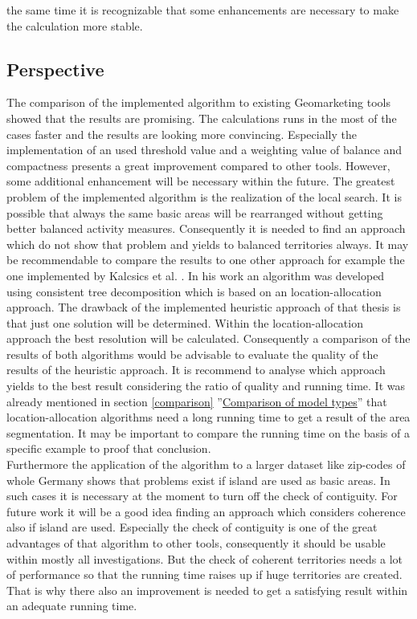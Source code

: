 the same time it is recognizable that some enhancements are necessary to make the calculation more stable.

\newpage
\subsection{Perspective}
The comparison of the implemented algorithm to existing Geomarketing tools showed that the results are promising. The calculations runs in the most of the cases faster and the results are looking more convincing. Especially the implementation of an used threshold value and a weighting value of balance and compactness presents a great improvement compared to other tools. However, some additional enhancement will be necessary within the future. The greatest problem of the implemented algorithm is the realization of the local search. It is possible that always the same basic areas will be rearranged without getting better balanced activity measures. Consequently it is needed to find an approach which do not show that problem and yields to balanced territories always. It may be recommendable to compare the results to one other approach for example the one implemented by Kalcsics et al. \cite{kalcsics}. In his work an algorithm was developed using consistent tree decomposition which is based on an location-allocation approach. The drawback of the implemented heuristic approach of that thesis is that just one solution will be determined. Within the location-allocation approach the best resolution will be calculated. Consequently a comparison of the results of both algorithms would be advisable to evaluate the quality of the results of the heuristic approach. It is recommend to analyse which approach yields to the best result considering the ratio of quality and running time. It was already mentioned in section \ref{comparison} ''\hyperref[comparison]{Comparison of model types}'' that location-allocation algorithms need a long running time to get a result of the area segmentation. It may be important to compare the running time on the basis of a specific example to proof that conclusion. \\
Furthermore the application of the algorithm to a larger dataset like zip-codes of whole Germany shows that problems exist if island are used as basic areas. In such cases it is necessary at the moment to turn off the check of contiguity. For future work it will be a good idea finding an approach which considers coherence also if island are used. Especially the check of contiguity is one of the great advantages of that algorithm to other tools, consequently it should be usable within mostly all investigations. But the check of coherent territories needs a lot of performance so that the running time raises up if huge territories are created. That is why there also an improvement is needed to get a satisfying result within an adequate running time.\\
